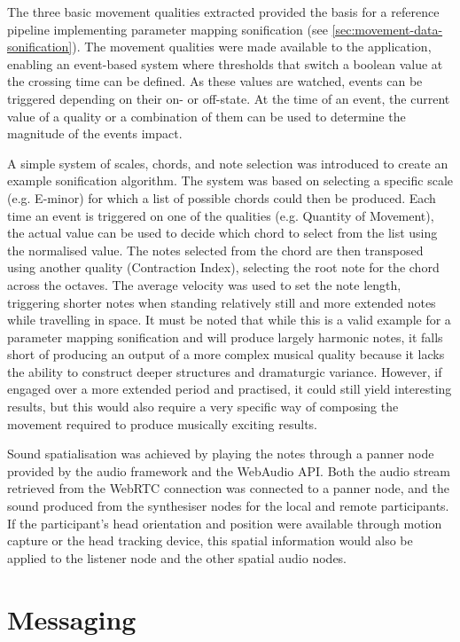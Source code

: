 The three basic movement qualities extracted provided the basis for a reference pipeline implementing parameter mapping sonification (see \autoref{sec:movement-data-sonification}).
The movement qualities were made available to the application, enabling an event-based system where thresholds that switch a boolean value at the crossing time can be defined.
As these values are watched, events can be triggered depending on their on- or off-state.
At the time of an event, the current value of a quality or a combination of them can be used to determine the magnitude of the event\textquotesingle s impact.

A simple system of scales, chords, and note selection was introduced to create an example sonification algorithm.
The system was based on selecting a specific scale (e.g. E-minor) for which a list of possible chords could then be produced.
Each time an event is triggered on one of the qualities (e.g. Quantity of Movement), the actual value can be used to decide which chord to select from the list using the normalised value.
The notes selected from the chord are then transposed using another quality (Contraction Index), selecting the root note for the chord across the octaves.
The average velocity was used to set the note length, triggering shorter notes when standing relatively still and more extended notes while travelling in space.
It must be noted that while this is a valid example for a parameter mapping sonification and will produce largely harmonic notes, it falls short of producing an output of a more complex musical quality because it lacks the ability to construct deeper structures and dramaturgic variance.
However, if engaged over a more extended period and practised, it could still yield interesting results, but this would also require a very specific way of composing the movement required to produce musically exciting results.

Sound spatialisation was achieved by playing the notes through a panner node provided by the audio framework and the WebAudio \ac{API}.
Both the audio stream retrieved from the \ac{WebRTC} connection was connected to a panner node, and the sound produced from the synthesiser nodes for the local and remote participants.
If the participant's head orientation and position were available through motion capture or the head tracking device, this spatial information would also be applied to the listener node and the other spatial audio nodes.

\section{Messaging}
\label{sec:messaging}

